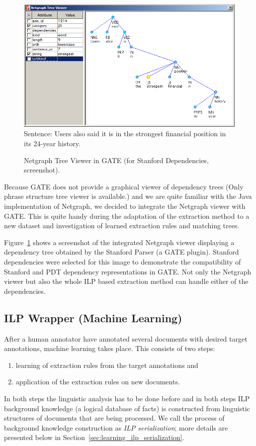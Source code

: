 \begin{figure}[ht!]
	\centering
		\includegraphics[width=0.95\hsize]{netgraph_stanford}
		\\Sentence: Users also said it is in the strongest financial position in its 24-year history.
	\caption{Netgraph Tree Viewer in GATE (for Stanford Dependencies, screenshot).}
	\label{fig:GATE_Netgraph}
\end{figure}


Because GATE does not provide a graphical viewer of dependency trees (Only phrase structure tree viewer is available.) and we are quite familiar with the Java implementation of Netgraph, we decided to integrate the Netgraph viewer with GATE. This is quite handy during the adaptation of the extraction method to a new dataset and investigation of learned extraction rules and matching trees.

Figure~\ref{fig:GATE_Netgraph} shows a screenshot of the integrated Netgraph viewer displaying a dependency tree obtained by the Stanford Parser (a GATE plugin). Stanford dependencies were selected for this image to demonstrate the compatibility of Stanford and PDT dependency representations in GATE. Not only the Netgraph viewer but also the whole ILP based extraction method can handle either of the dependencies. 





\subsection{ILP Wrapper (Machine Learning)} \label{sec:learning_ilp_wrapper}
After a human annotator have annotated several documents with desired target annotations, machine learning takes place. 
This consists of two steps: 
\begin{enumerate}
	\item learning of extraction rules from the target annotations and
	\item application of the extraction rules on new documents.
\end{enumerate}
In both steps the linguistic analysis has to be done before and in both steps ILP background knowledge (a logical database of facts) is constructed from linguistic structures of documents that are being processed. We call the process of background knowledge construction as \emph{ILP serialization}; more details are presented below in Section~\ref{sec:learning_ilp_serialization}.

